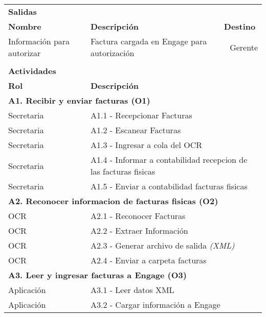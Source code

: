 \begin{longtable}{|llrrrrrr|}
       &       &       &       &       &       &       &  \\ \hline
    \multicolumn{8}{|l|}{\textbf{Salidas}} \\ \hline
    \textbf{Nombre} & \multicolumn{5}{|l|}{\textbf{Descripción}} & \multicolumn{2}{|l|}{\textbf{Destino}} \\ \hline
     Información para autorizar & \multicolumn{5}{|m{6cm}|}{Factura cargada en Engage para autorización} & \multicolumn{2}{|m{3cm}|}{Gerente} \\ \hline
       &       &       &       &       &       &       &  \\ \hline
	
	\multicolumn{8}{|l|}{\textbf{Actividades}} \\ \hline
    \textbf{Rol} & \multicolumn{7}{|l|}{\textbf{Descripción}} \\ \hline 
    \multicolumn{8}{|l|}{\textbf{A1. Recibir y enviar facturas  (O1) }} \\ \hline
    Secretaria & \multicolumn{7}{|m{12cm}|}{A1.1 - Recepcionar Facturas} \\ \hline
    Secretaria & \multicolumn{7}{|m{12cm}|}{A1.2 - Escanear Facturas} \\ \hline
    Secretaria & \multicolumn{7}{|m{12cm}|}{A1.3 - Ingresar a cola del OCR} \\ \hline
    Secretaria & \multicolumn{7}{|m{12cm}|}{A1.4 - Informar a contabilidad recepcion de las facturas fisicas} \\ \hline
    Secretaria & \multicolumn{7}{|m{12cm}|}{A1.5 -  Enviar a contabilidad facturas fisicas} \\ \hline 
   
    \multicolumn{8}{|l|}{\textbf{A2. Reconocer informacion de facturas fisicas  (O2) }} \\ \hline
    OCR & \multicolumn{7}{|m{12cm}|}{A2.1 - Reconocer Facturas} \\ \hline
    OCR & \multicolumn{7}{|m{12cm}|}{A2.2 - Extraer Información} \\ \hline
    OCR & \multicolumn{7}{|m{12cm}|}{A2.3 - Generar archivo de salida \textit{(XML)}} \\ \hline
    OCR & \multicolumn{7}{|m{12cm}|}{A2.4 - Enviar a carpeta facturas} \\ \hline
    
    \multicolumn{8}{|l|}{\textbf{A3. Leer y ingresar facturas a Engage (O3) }} \\ \hline
    Aplicación & \multicolumn{7}{|m{12cm}|}{A3.1 - Leer datos XML} \\ \hline
    Aplicación & \multicolumn{7}{|m{12cm}|}{A3.2 - Cargar información a Engage} \\ \hline


\end{longtable}
